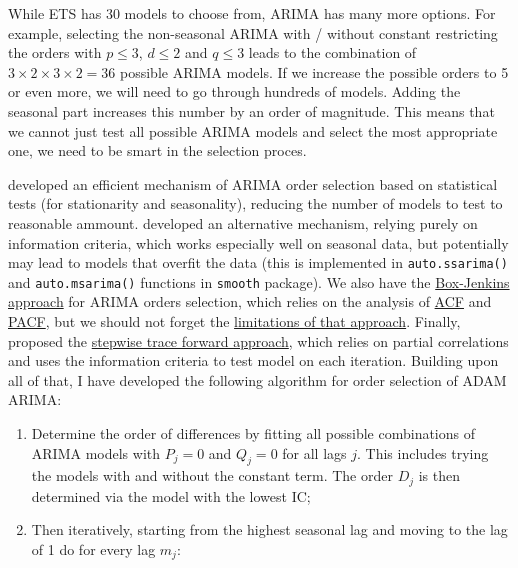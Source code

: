 \documentclass[
]{book}
\providecommand{\tightlist}{%
  \setlength{\itemsep}{0pt}\setlength{\parskip}{0pt}}
\theoremstyle{definition}
\theoremstyle{definition}
\theoremstyle{definition}
\theoremstyle{definition}
\theoremstyle{remark}
\begin{document}
While ETS has 30 models to choose from, ARIMA has many more options. For example, selecting the non-seasonal ARIMA with / without constant restricting the orders with \(p \leq 3\), \(d \leq 2\) and \(q \leq 3\) leads to the combination of \(3 \times 2 \times 3 \times 2 = 36\) possible ARIMA models. If we increase the possible orders to 5 or even more, we will need to go through hundreds of models. Adding the seasonal part increases this number by an order of magnitude. This means that we cannot just test all possible ARIMA models and select the most appropriate one, we need to be smart in the selection proces.

\citet{Hyndman2008Forecast} developed an efficient mechanism of ARIMA order selection based on statistical tests (for stationarity and seasonality), reducing the number of models to test to reasonable ammount. \citet{Svetunkov2019} developed an alternative mechanism, relying purely on information criteria, which works especially well on seasonal data, but potentially may lead to models that overfit the data (this is implemented in \texttt{auto.ssarima()} and \texttt{auto.msarima()} functions in \texttt{smooth} package). We also have the \protect\hyperlink{BJApproach}{Box-Jenkins approach} for ARIMA orders selection, which relies on the analysis of \protect\hyperlink{ACF}{ACF} and \protect\hyperlink{PACF}{PACF}, but we should not forget the \protect\hyperlink{BJApproachSummary}{limitations of that approach}. Finally, \citet{Sagaert2021} proposed the \protect\hyperlink{ETSXSelection}{stepwise trace forward approach}, which relies on partial correlations and uses the information criteria to test model on each iteration. Building upon all of that, I have developed the following algorithm for order selection of ADAM ARIMA:

\begin{enumerate}
\def\labelenumi{\arabic{enumi}.}
\tightlist
\item
  Determine the order of differences by fitting all possible combinations of ARIMA models with \(P_j=0\) and \(Q_j=0\) for all lags \(j\). This includes trying the models with and without the constant term. The order \(D_j\) is then determined via the model with the lowest IC;
\item
  Then iteratively, starting from the highest seasonal lag and moving to the lag of 1 do for every lag \(m_j\):
\end{enumerate}
\end{document}

